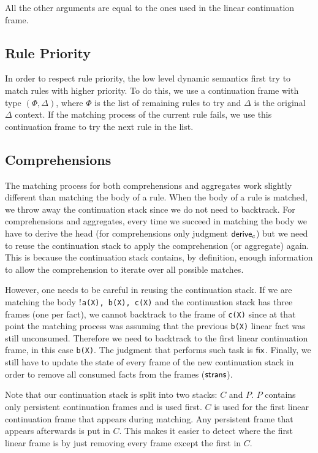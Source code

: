 All the other arguments are equal to the ones used in the linear continuation frame.

\subsection{Rule Priority}

In order to respect rule priority, the low level dynamic semantics first try to match rules with
higher priority. To do this, we use a continuation frame with type $(\Phi, \Delta)$, where $\Phi$
is the list of remaining rules to try and $\Delta$ is the original $\Delta$ context. If the matching
process of the current rule fails, we use this continuation frame to try the next rule in the list.

\subsection{Comprehensions}

The matching process for both comprehensions and aggregates work slightly different than matching the
body of a rule. When the body of a rule is matched, we throw away the continuation stack since we
do not need to backtrack. For comprehensions and aggregates, every time we succeed in matching the body
we have to derive the head (for comprehensions only judgment $\mathsf{derive}_c$) but we need to reuse the
continuation stack to
apply the comprehension (or aggregate) again. This is because the continuation stack contains,
by definition, enough information to allow the comprehension to iterate over all possible matches.

However, one needs to be careful in reusing the continuation stack. If we are matching the body
\texttt{${!}$a(X), b(X), c(X)} and the continuation stack has three frames (one per fact), we cannot
backtrack to the frame of \texttt{c(X)} since at that point the matching process was assuming that the previous
\texttt{b(X)} linear fact was still unconsumed. Therefore we need to backtrack to the first linear
continuation frame, in this case \texttt{b(X)}. The judgment that performs such task is $\mathsf{fix}$.
Finally, we still have to update the state of every frame
of the new continuation stack in order to remove all consumed facts from the frames ($\mathsf{strans}$).

Note that our continuation stack is split into two stacks: $C$ and $P$. $P$ contains only
persistent continuation frames and is used first. $C$ is used for the first linear continuation frame
that appears during matching. Any persistent frame that appears afterwards is put in $C$. This makes
it easier to detect where the first linear frame is by just removing every frame except the first in $C$.

